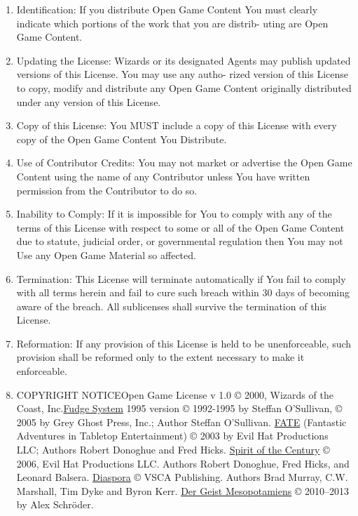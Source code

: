 \documentclass{tufte-handout}
\begin{document}
\begin{fullwidth}
\begin{enumerate}
\item Identification: If you distribute Open Game Content You must
  clearly indicate which portions of the work that you are distrib-
  uting are Open Game Content.

\item Updating the License: Wizards or its designated Agents may
  publish updated versions of this License. You may use any autho-
  rized version of this License to copy, modify and distribute any
  Open Game Content originally distributed under any version of this
  License.

\item Copy of this License: You MUST include a copy of this License
  with every copy of the Open Game Content You Distribute.

\item Use of Contributor Credits: You may not market or advertise the
  Open Game Content using the name of any Contributor unless You have
  written permission from the Contributor to do so.

\item Inability to Comply: If it is impossible for You to comply with
  any of the terms of this License with respect to some or all of the
  Open Game Content due to statute, judicial order, or governmental
  regulation then You may not Use any Open Game Material so affected.

\item Termination: This License will terminate automatically if You
  fail to comply with all terms herein and fail to cure such breach
  within 30 days of becoming aware of the breach. All sublicenses
  shall survive the termination of this License.

\item Reformation: If any provision of this License is held to be
  unenforceable, such provision shall be reformed only to the extent
  necessary to make it enforceable.

\item COPYRIGHT NOTICE\newline Open Game License v 1.0 © 2000, Wizards
  of the Coast, Inc.\newline \href{http://www.fudgerpg.com/}{Fudge
    System} 1995 version © 1992-1995 by Steffan O'Sullivan, © 2005 by
  Grey Ghost Press, Inc.; Author Steffan O'Sullivan.\newline
  \href{http://www.faterpg.com/}{\textsf{FATE}} (Fantastic Adventures
  in Tabletop Entertainment) © 2003 by Evil Hat Productions LLC;
  Authors Robert Donoghue and Fred Hicks.\newline
  \href{http://www.crackmonkey.org/\%7Enick/loyhargil/fate3/fate3.html}{Spirit
    of the Century} © 2006, Evil Hat Productions LLC. Authors Robert
  Donoghue, Fred Hicks, and Leonard Balsera.\newline
  \href{http://www.vsca.ca/Diaspora/diaspora-srd.html}{Diaspora} ©
  VSCA Publishing. Authors Brad Murray, C.W. Marshall, Tim Dyke and
  Byron Kerr.\newline
  \href{http://campaignwiki.org/wiki/MontagInZürich/Der_Geist_Mesopotamiens}{Der
    Geist Mesopotamiens} © 2010--2013 by Alex Schröder.


\end{enumerate}
\end{fullwidth}
\end{document}
